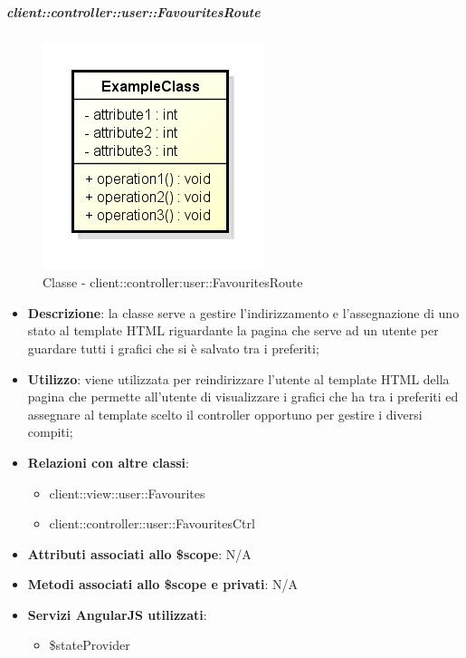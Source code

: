 		\subparagraph{client::controller::user::FavouritesRoute} %
		\label{subp:bdsm_app_client_controller_user_favouritesroute}
			\begin{figure}[htbp]
				\centering
				\centerline{\includegraphics[scale=0.7]{./images/client/classes/example_class.png}}
				\caption{Classe - client::controller:user::FavouritesRoute}
			\end{figure}
			\begin{itemize}
				\item \textbf{Descrizione}: la classe serve a gestire l'indirizzamento e l'assegnazione di uno stato al template HTML riguardante la pagina che serve ad un utente per guardare tutti i grafici che si è salvato tra i preferiti;
				\item \textbf{Utilizzo}: viene utilizzata per reindirizzare l'utente al template HTML della pagina che permette all'utente di visualizzare i grafici che ha tra i preferiti ed assegnare al template scelto il controller opportuno per gestire i diversi compiti;
				\item \textbf{Relazioni con altre classi}:
					\begin{itemize}
						\item client::view::user::Favourites
						\item client::controller::user::FavouritesCtrl
					\end{itemize}
				\item \textbf{Attributi associati allo \$scope}: N/A
				\item \textbf{Metodi associati allo \$scope e privati}: N/A
				\item \textbf{Servizi AngularJS utilizzati}:
					\begin{itemize}
						\item \$stateProvider
					\end{itemize}
			\end{itemize}



